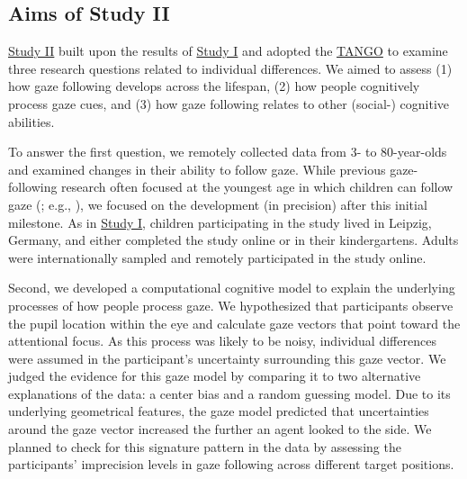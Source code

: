 \documentclass[
]{scrbook}
\begin{document}
\subsection{Aims of Study II}\label{aims-studyII}

\hyperref[studyII]{Study II} built upon the results of \hyperref[studyI]{Study I} and adopted the \hyperref[acronyms_TANGO]{TANGO} to examine three research questions related to individual differences. We aimed to assess (1) how gaze following develops across the lifespan, (2) how people cognitively process gaze cues, and (3) how gaze following relates to other (social-) cognitive abilities.

To answer the first question, we remotely collected data from 3- to 80-year-olds and examined changes in their ability to follow gaze. While previous gaze-following research often focused at the youngest age in which children can follow gaze (; e.g., ), we focused on the development (in precision) after this initial milestone. As in \hyperref[studyI]{Study I}, children participating in the study lived in Leipzig, Germany, and either completed the study online or in their kindergartens. Adults were internationally sampled and remotely participated in the study online.

Second, we developed a computational cognitive model to explain the underlying processes of how people process gaze. We hypothesized that participants observe the pupil location within the eye and calculate gaze vectors that point toward the attentional focus. As this process was likely to be noisy, individual differences were assumed in the participant's uncertainty surrounding this gaze vector. We judged the evidence for this gaze model by comparing it to two alternative explanations of the data: a center bias and a random guessing model. Due to its underlying geometrical features, the gaze model predicted that uncertainties around the gaze vector increased the further an agent looked to the side. We planned to check for this signature pattern in the data by assessing the participants' imprecision levels in gaze following across different target positions.
\end{document}
